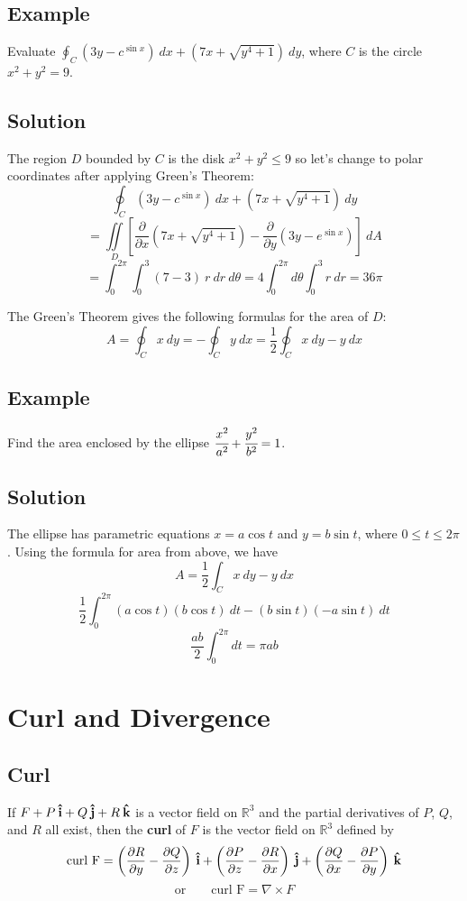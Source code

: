 \subsection*{Example}
Evaluate $\oint_C (3y-c^{\sin{x}})\:dx+(7x+\sqrt{y^4+1})\:dy$, where $C$ is the circle
$x^2+y^2=9$.

\subsection*{Solution}
The region $D$ bounded by $C$ is the disk $x^2+y^2\leq 9$ so let's change to polar
coordinates after applying Green's Theorem:
$$\oint_C (3y-c^{\sin{x}})\:dx+(7x+\sqrt{y^4+1})\:dy$$
$$=\iint\limits_D \left[\frac{\partial}{\partial x}(7x+\sqrt{y^4+1})-\frac{\partial}{\partial y}
                (3y-e^{\sin{x}})\right]\:dA$$
$$=\int_0^{2\pi}\int_0^3 (7-3)\:r\:dr\:d\theta=4\int_0^{2\pi}d\theta\int_0^3r\:dr=36\pi$$

The Green's Theorem gives the following formulas for the area of $D$:
$$A=\oint_C x\:dy=-\oint_C y\:dx=\frac{1}{2}\oint_C x\:dy-y\:dx$$

\subsection*{Example}
Find the area enclosed by the ellipse $\cfrac{x^2}{a^2}+\cfrac{y^2}{b^2}=1$.

\subsection*{Solution}
The ellipse has parametric equations $x=a\cos{t}$ and $y=b\sin{t}$, where $0\leq t\leq 2\pi$.
Using the formula for area from above, we have
$$A=\frac{1}{2}\int_C x\:dy-y\:dx$$
$$\frac{1}{2}\int_0^{2\pi}(a\cos{t})(b\cos{t})\:dt-(b\sin{t})(-a\sin{t})\:dt$$
$$\frac{ab}{2}\int_0^{2\pi}dt=\pi ab$$

\section{Curl and Divergence}

\subsection*{Curl}
If $F+P\:\boldsymbol{\hat{\textbf{i}}}+Q\:\boldsymbol{\hat{\textbf{j}}}+R\:\boldsymbol{\hat{\textbf{k}}}$ is a vector field on $\mathbb{R}^3$ and the partial
derivatives of $P$, $Q$, and $R$ all exist, then the \textbf{curl} of $F$ is the
vector field on $\mathbb{R}^3$ defined by
$$\text{curl F}=\left(\pdv{R}{y}-\pdv{Q}{z}\right)\:\boldsymbol{\hat{\textbf{i}}}+\left(\pdv{P}{z}-\pdv{R}{x}\right)\:\boldsymbol{\hat{\textbf{j}}}+
        \left(\pdv{Q}{x}-\pdv{P}{y}\right)\:\boldsymbol{\hat{\textbf{k}}}$$
$$\text{or} \qquad \text{curl F}=\nabla \times F$$


